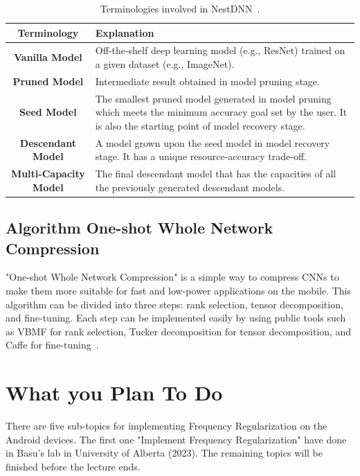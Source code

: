\documentclass{article}
\begin{document}
\begin{table}
	\label{table_nestdnn}
	\centering
	\begin{tabular}{|c|>{\centering\arraybackslash}p{8cm}|}
		\hline
		\textbf{Terminology}&\textbf{Explanation}\\
		\hline
		\textbf{Vanilla Model}&Off-the-shelf deep learning model (e.g., ResNet) trained on a given dataset (e.g., ImageNet). \\
		\hline
		\textbf{Pruned Model}&Intermediate result obtained in model pruning stage.\\
		\hline
		\textbf{Seed Model}&The smallest pruned model generated in model pruning which meets the minimum accuracy goal set by the user. It is also the starting point of model recovery stage.\\
		\hline
		\textbf{Descendant Model}&A model grown upon the seed model in model recovery stage. It has a unique resource-accuracy trade-off.\\
		\hline
		\textbf{Multi-Capacity Model}&The final descendant model that has the capacities of
		all the previously generated descendant models.\\
		\hline
	\end{tabular}
	\caption{Terminologies involved in NestDNN~\cite{fang2018nestdnn}.}
\end{table}


\subsection{Algorithm One-shot Whole Network Compression}\label{oneshot}
"One-shot Whole Network Compression" is a simple way to compress CNNs to make them more suitable for fast and low-power applications on the mobile. This algorithm can be divided into three steps: rank selection, tensor decomposition, and fine-tuning. Each step can be implemented easily by using public tools such as VBMF for rank selection, Tucker decomposition for tensor decomposition, and Caffe for fine-tuning~\cite{kim2016compression}.

\section*{What you Plan To Do}
There are five sub-topics for implementing Frequency Regularization on the Android devices. The first one "Implement Frequency Regularization" have done in Basu's lab in University of Alberta (2023). The remaining topics will be finished before the lecture ends.
\end{document}
